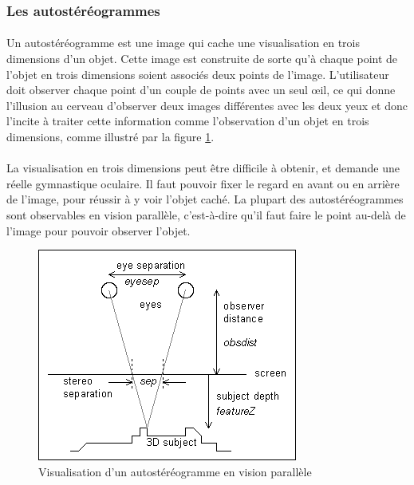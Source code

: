 \subsubsection{Les autostéréogrammes}	

\paragraph{}
	Un autostéréogramme est une image qui cache une visualisation en trois dimensions d’un objet. Cette image est construite de sorte qu'à chaque point de l'objet en trois dimensions soient associés deux points de l'image. L'utilisateur doit observer chaque point d'un couple de points avec un seul œil, ce qui donne l'illusion au cerveau d'observer deux images différentes avec les deux yeux et donc l'incite à traiter cette information comme l'observation d'un objet en trois dimensions, comme illustré par la figure \ref{fig:ppe_autostereogramme}.

\paragraph{}
	La visualisation en trois dimensions peut être difficile à obtenir, et demande une réelle gymnastique oculaire. Il faut pouvoir fixer le regard en avant ou en arrière de l’image, pour réussir à y voir l’objet caché. La plupart des autostéréogrammes sont observables en vision parallèle, c'est-à-dire qu'il faut faire le point au-delà de l'image pour pouvoir observer l'objet.

\begin{figure}[h]
  \centering
  \includegraphics[scale=0.5]{./ppe_autostereogramme.png}
  \caption{Visualisation d’un autostéréogramme en vision parallèle \protect \footnotemark }
  \label{fig:ppe_autostereogramme}
\end{figure}

